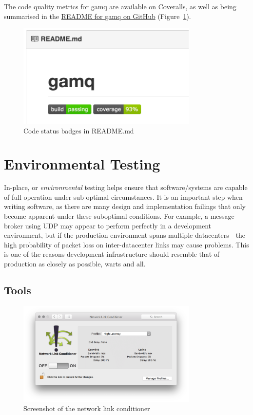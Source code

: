 The code quality metrics for \gls{gamq} are available
\href{https://coveralls.io/github/FireEater64/gamq?branch=master}{on Coveralls},
as well as being summarised in the
\href{https://github.com/FireEater64/gamq/blob/master/README.md}{README for
\gls{gamq} on GitHub} (Figure~\ref{fig:readmeStatus}).

\begin{figure}
  \includegraphics[width=0.8\textwidth]{figures/README}
  \centering
  \caption{Code status badges in README.md}
  \label{fig:readmeStatus}
\end{figure}

\section{Environmental Testing}
\label{sec:environmentalTesting}

In-place, or \emph{environmental} testing helps ensure that software/systems are
capable of full operation under sub-optimal circumstances. It is an important
step when writing software, as there are many design and implementation failings
that only become apparent under these suboptimal conditions. For example, a
message broker using UDP may appear to perform perfectly in a development
environment, but if the production environment spans multiple datacenters - the
high probability of packet loss on inter-datacenter links may cause problems.
This is one of the reasons development infrastructure should resemble that of
production as closely as possible, warts and all.

\subsection{Tools}
\label{sub:Tools}

\begin{figure}[htbp]
  \includegraphics[width=0.8\textwidth]{figures/networkLinkConditioner}
  \centering
  \caption{Screenshot of the network link conditioner}
  \label{fig:linkConditioner}
\end{figure}

